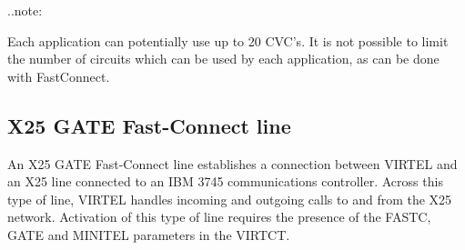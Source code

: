 \documentclass[letterpaper,10pt,english]{sphinxmanual}
\begin{document}
..note:

\begin{sphinxVerbatim}[commandchars=\\\{\}]
Each application can potentially use up to 20 CVC’s. It is not possible to limit the number of circuits which can be used by each application, as can be done with Fast\PYGZhy{}Connect.
\end{sphinxVerbatim}


\subsection{X25 GATE Fast-Connect line}
\label{\detokenize{connectivity_guide:x25-gate-fast-connect-line}}
An X25 GATE Fast-Connect line establishes a connection between VIRTEL and an X25 line connected to an IBM 3745 communications controller. Across this type of line, VIRTEL handles incoming and outgoing calls to and from the X25 network. Activation of this type of line requires the presence of the FASTC, GATE and MINITEL parameters in the VIRTCT.

\end{document}
